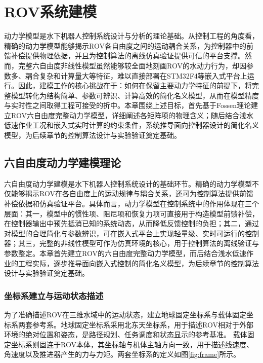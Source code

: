 
\chapter{ROV系统建模}

动力学模型是水下机器人控制系统设计与分析的理论基础。从控制工程的角度看，精确的动力学模型能够揭示ROV各自由度之间的运动耦合关系，为控制器中的前馈补偿提供物理依据，并且为控制算法的离线仿真验证提供可信的平台支撑。然而，完整六自由度非线性模型虽然能够较全面地刻画ROV的水动力行为，却因参数多、耦合复杂和计算量大等特征，难以直接部署在STM32F4等嵌入式平台上运行。因此，建模工作的核心挑战在于：如何在保留主要动力学特征的前提下，将完整模型转化为结构简单、参数可辨识、计算高效的简化名义模型，从而在模型精度与实时性之间取得工程可接受的折中。本章围绕上述目标，首先基于Fossen理论建立ROV六自由度完整动力学模型，详细阐述各矩阵项的物理含义；随后结合浅水低速作业工况和嵌入式实时计算的约束条件，系统推导面向控制器设计的简化名义模型，为后续章节的控制算法设计与实验验证奠定基础。

\section{六自由度动力学建模理论}

六自由度动力学建模是水下机器人控制系统设计的基础环节。精确的动力学模型不仅能够揭示ROV在各自由度上的运动规律与耦合关系，还可为控制算法提供前馈补偿依据和仿真验证平台。具体而言，动力学模型在控制系统中的作用体现在三个层面：其一，模型中的惯性项、阻尼项和恢复力项可直接用于构造模型前馈补偿，在控制器输出中预先抵消已知的系统动态，从而降低反馈控制的负担；其二，通过对模型的合理简化与参数辨识，可在嵌入式平台上实现轻量级、实时可运行的控制器；其三，完整的非线性模型可作为仿真环境的核心，用于控制算法的离线验证与参数整定。本章首先建立ROV的六自由度完整动力学模型，而后结合浅水低速作业的工程实际，逐步推导面向嵌入式控制的简化名义模型，为后续章节的控制算法设计与实验验证奠定基础。

\subsection{坐标系建立与运动状态描述}

为了准确描述ROV在三维水域中的运动状态，建立地球固定坐标系与载体固定坐标系两套参考系。地球固定坐标系采用北东天坐标系，用于描述ROV相对于外部环境的绝对位置和姿态，是路径规划、任务调度和状态显示的参考基准。
载体固定坐标系则固连于ROV本体，其坐标轴与机体主轴方向一致，用于描述线速度、角速度以及推进器产生的力与力矩。两套坐标系的定义如图\ref{fig:frame}所示。


